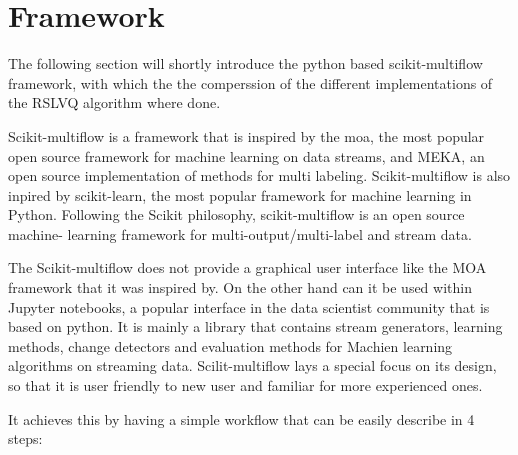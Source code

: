 \documentclass[12pt,oneside,a4paper,parskip]{scrbook}
\begin{document}
\section{Framework}

The following section will shortly introduce the python based scikit-multiflow framework, with which the the comperssion 
of the different implementations of the RSLVQ algorithm where done.

Scikit-multiflow is a framework that is inspired by the \ac{moa}, the most popular open source framework for machine learning on data streams,
and MEKA, an open source implementation of methods for multi labeling. Scikit-multiflow is also inpired by scikit-learn, the most 
popular framework for machine learning in Python. Following the Scikit philosophy, scikit-multiflow is an open source machine-
learning framework for multi-output/multi-label and stream data. 

The Scikit-multiflow does not provide a graphical user interface like the MOA framework that it was inspired by. 
On the other hand can it be used within Jupyter notebooks, a popular interface in the data scientist community that is based 
on python. 
It is mainly a library that contains stream generators, learning methods, change detectors and evaluation methods for 
Machien learning algorithms on streaming data. 
Scilit-multiflow lays a special focus on its design, so that it is user friendly to new user and familiar for more 
experienced ones.\cite{skmultiflow}

It achieves this by having a simple workflow that can be easily describe in 4 steps:
\end{document}
